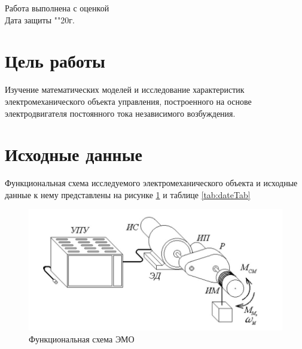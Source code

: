 \documentclass[a4paper, 12pt]{article}
\begin{document}
\begin{titlepage}
		Работа выполнена с оценкой \hspace{0.5cm} \underline{\hspace{10cm}} \\ 
		\vspace{1cm}
		Дата защиты "\underline{\hspace{0.4cm}}"\hspace{0.1cm}\underline{\hspace{1.5cm}}\hspace{0.1cm}20\underline{\hspace{0.4cm}}г.
		
	\end{titlepage}


\section*{Цель работы}
	Изучение математических моделей и исследование характеристик электромеханического объекта управления, построенного на основе электродвигателя постоянного тока независимого возбуждения.
\section*{Исходные данные}
Функциональная схема исследуемого электромеханического объекта и исходные данные к нему представлены на рисунке \ref{EMO} и таблице \ref{tab:dateTab}
	\begin{figure}[h!]
		\centering
		\includegraphics[width = 1\textwidth]{EMO}
		\caption{Функциональная схема ЭМО}
		\label{EMO}
	\end{figure}
\end{document}
